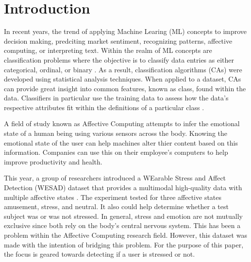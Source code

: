 \section{Introduction}
\label{sec:intro}

In recent years, the trend of applying Machine Learing (ML) concepts to improve decision making, predciting 
market sentiment, recognizing patterns, affective computing, or interpreting text. 
Within the realm of ML concepts are classification problems where the objective is to classify data entries 
as either categorical, ordinal, or binary \cite[p. 327-328]{textbook}. 
As a result, classification algorithms (CAs) were developed using statistical analysis techniques. 
When applied to a dataset, CAs can provide great insight into common features, known as class,
found within the data. Classifiers in particular use the training data to assess how the data's respective 
attributes fit within the definitions of a particular class \cite{class}. 

A field of study known as Affective Computing attempts to infer the emotional state of a human being using 
various sensors across the body. Knowing the emotional state of the user can help machines alter thier 
content based on this information. Companies can use this on their employee's computers to help improve 
productivity and health. 

This year, a group of researchers introduced a WEarable Stress and Affect Detection (WESAD) dataset that 
provides a multimodal high-quality data with multiple affective states \cite{WESAD}. The experiment 
tested for three affective states amusement, stress, and neutral. It also could help determine whether a test 
subject was or was not stressed. In general, stress and emotion are not mutually exclusive since both 
rely on the body's central nervous system. This has been a problem within the Affective Computing 
research field. However, this dataset was made with the intention of bridging this problem. 
For the purpose of this paper, the focus is geared towards detecting if a user is stressed or not.  
